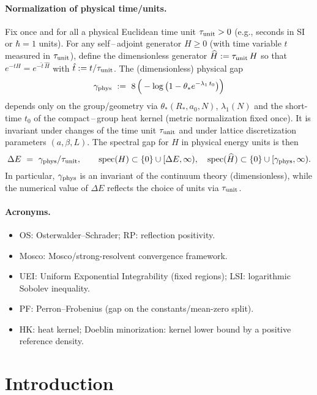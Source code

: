 \documentclass[11pt]{amsart}
\theoremstyle{plain}
\theoremstyle{definition}
\theoremstyle{remark}
\begin{document}
\paragraph{Normalization of physical time/units.}
Fix once and for all a physical Euclidean time unit $\tau_{\rm unit}>0$ (e.g., seconds in SI or $\hbar=1$ units). For any self\,–\,adjoint generator $H\ge 0$ (with time variable $t$ measured in $\tau_{\rm unit}$), define the dimensionless generator $\widehat H:=\tau_{\rm unit}\,H$ so that $e^{-t H}=e^{-\hat t\,\widehat H}$ with $\hat t:=t/\tau_{\rm unit}$. The (dimensionless) physical gap
\[
  \gamma_{\rm phys}\ :=\ 8\,\Big(-\log\big(1-\theta_* e^{-\lambda_1\,t_0}\big)\Big)
\]
depends only on the group/geometry via $\theta_*(R_*,a_0,N)$, $\lambda_1(N)$ and the short-time $t_0$ of the compact\,–\,group heat kernel (metric normalization fixed once). It is invariant under changes of the time unit $\tau_{\rm unit}$ and under lattice discretization parameters $(a,\beta,L)$. The spectral gap for $H$ in physical energy units is then
\[
  \Delta E\ =\ \gamma_{\rm phys}/\tau_{\rm unit},\qquad \operatorname{spec}(H)\subset\{0\}\cup[\Delta E,\infty),\quad \operatorname{spec}(\widehat H)\subset\{0\}\cup[\gamma_{\rm phys},\infty).
\]
In particular, $\gamma_{\rm phys}$ is an invariant of the continuum theory (dimensionless), while the numerical value of $\Delta E$ reflects the choice of units via $\tau_{\rm unit}$.

\paragraph{Acronyms.}
\begin{itemize}
  \item OS: Osterwalder--Schrader; RP: reflection positivity.
  \item Mosco: Mosco/strong-resolvent convergence framework.
  \item UEI: Uniform Exponential Integrability (fixed regions); LSI: logarithmic Sobolev inequality.
  \item PF: Perron--Frobenius (gap on the constants/mean-zero split).
  \item HK: heat kernel; Doeblin minorization: kernel lower bound by a positive reference density.
\end{itemize}

\section{Introduction}
\end{document}
